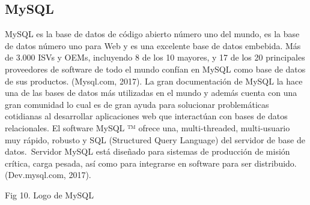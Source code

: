 \subsection{MySQL}
MySQL es la base de datos de código abierto número uno del mundo, es la base de datos número uno para Web y es una excelente base de datos embebida. Más de 3.000 ISVs y OEMs, incluyendo 8 de los 10 mayores, y 17 de los 20 principales proveedores de software de todo el mundo confían en MySQL como base de datos de sus productos. (Mysql.com, 2017).
La gran documentación de MySQL la hace una de las bases de datos más utilizadas en el mundo y además cuenta con una gran comunidad lo cual es de gran ayuda para solucionar problemáticas cotidianas al desarrollar aplicaciones web que interactúan con bases de datos relacionales.
El software MySQL ™ ofrece una, multi-threaded, multi-usuario muy rápido, robusto y SQL (Structured Query Language) del servidor de base de datos. Servidor MySQL está diseñado para sistemas de producción de misión crítica, carga pesada, así como para integrarse en software para ser distribuido. (Dev.mysql.com, 2017).



Fig 10. Logo de MySQL
